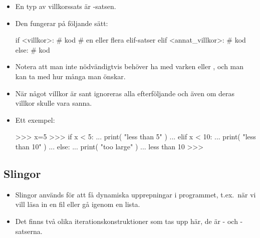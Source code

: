 \documentclass{beamer}
\begin{document}
\begin{frame}[fragile]{\insertsubsectionhead}
  \begin{itemize}
    \item En typ av villkorssats är -satsen.

    \item Den fungerar på följande sätt:
      \begin{src}[language=python]
if <villkor>:
    # kod
# en eller flera elif-satser
elif <annat_villkor>:
    # kod
else:
    # kod
      \end{src}

    \item Notera att man inte nödvändigtvis behöver ha med varken  
      eller , och man kan ta med hur många  man önskar.

  \end{itemize}
\end{frame}

\begin{frame}[fragile]{\insertsubsectionhead}
  \begin{itemize}
    \item När något villkor är sant ignoreras alla efterföljande  
      och  även om deras villkor skulle vara sanna.

    \item Ett exempel:
      \begin{terminal}
>>> x=5
>>> if x < 5:
...     print( "less than 5" )
... elif x < 10:
...     print( "less than 10" )
... else:
...     print( "too large" )
...
less than 10
>>>
    \end{terminal}

  \end{itemize}
\end{frame}

\subsection{Slingor}

\begin{frame}{\insertsubsectionhead}
  \begin{itemize}
    \item Slingor används för att få dynamiska upprepningar i programmet, 
      t.ex.\ när vi vill läsa in en fil eller gå igenom en lista.

    \item Det finns två olika iterationskonstruktioner som tas upp här, de är 
      - och -satserna.

  \end{itemize}
\end{frame}
\end{document}
